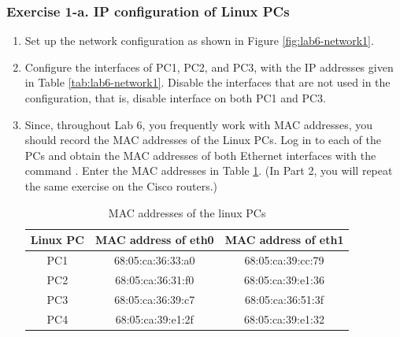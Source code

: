\subsubsection{Exercise 1-a. IP configuration of Linux PCs}
\begin{enumerate}
	\item Set up the network configuration as shown in Figure \ref{fig:lab6-network1}.
	\item Configure the interfaces of PC1, PC2, and PC3, with the IP addresses given in Table \ref{tab:lab6-network1}. Disable the interfaces that are not used in the configuration, that is, disable interface  on both PC1 and PC3.
	\item Since, throughout Lab 6, you frequently work with MAC addresses, you should record the MAC addresses of the Linux PCs. Log in to each of the PCs and obtain the MAC addresses of both Ethernet interfaces with the command . Enter the MAC addresses in Table \ref{tab:lab6-macs-pcs}. (In Part 2, you will repeat the same exercise on the Cisco routers.)
		\begin{table}[h!t]
			\centering
			\begin{tabular}{| c | c | c |}	
				\hline
				\textbf{Linux PC} & \textbf{MAC address of eth0} & \textbf{MAC address of eth1} \\ \hline
				PC1 & 68:05:ca:36:33:a0 & 68:05:ca:39:cc:79 \\ 
				PC2 & 68:05:ca:36:31:f0 & 68:05:ca:39:e1:36 \\
				PC3 & 68:05:ca:36:39:c7 & 68:05:ca:36:51:3f \\
				PC4 & 68:05:ca:39:e1:2f & 68:05:ca:39:e1:32 \\ \hline
			\end{tabular}
			\caption{MAC addresses of the linux PCs}
			\label{tab:lab6-macs-pcs}
		\end{table}
\end{enumerate}

